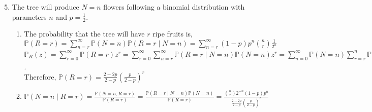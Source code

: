 \documentclass{article}
\begin{document}
\begin{enumerate}
    \setcounter{enumi}{4}
    \item 
    
    The tree will produce $N=n$ flowers following a binomial distribution with parameters $n$ and $p= \frac{1}{2}$.
    \begin{enumerate}
        \item 
        
        The probability that the tree will have $r$ ripe fruits is,\\
        $\mathbb{P}(R=r) = \sum_{n=r}^\infty \mathbb{P}(N=n)\mathbb{P}(R=r\mid N=n)=\sum_{n=r}^\infty (1-p)p^n\binom{n}{r}\frac{1}{2^n}$\\
        $\mathbb{P}_R(z) = \sum_{r=0}^\infty \mathbb{P}(R=r)z^r = \sum_{r=0}^\infty \sum_{n=r}^\infty\mathbb{P}(R=r\mid N=n)\mathbb{P}(N=n)z^r=\sum_{n=0}^\infty\mathbb{P}(N=n)\sum_{r=r}^n\mathbb{P}(R=r\mid N=n)\mathbb{P}(N=n)z^r=\sum_{n=0}^\infty\mathbb{P}(N=n)\mathbb{P}_{R\mid N=n}(z)=\sum_{n=0}^\infty(1-p)p^n(\frac{1+z}{2})^n=\frac{1-p}{1-p\frac{1+z}{2}}=\frac{2-2p}{2-p-pz}=\sum_{r=0}^\infty\frac{2-2p}{2-p}(\frac{p}{2-p})^rz^r$.\\
        Therefore, $\mathbb{P}(R=r)=\frac{2-2p}{2-p}(\frac{p}{2-p})^r$
        \item
        
        $\mathbb{P}(N=n\mid R=r)=\frac{\mathbb{P}(N=n, R=r)}{\mathbb{P}(R=r)}=\frac{\mathbb{P}(R=r\mid N=n)\mathbb{P}(N=n)}{\mathbb{P}(R=r)} = \frac{\binom{n}{r}2^{-n}(1-p)p^n}{\frac{2-2p}{2-p}(\frac{p}{2-p})^r}$
        
    \end{enumerate}
    
\end{enumerate}
\end{document}
